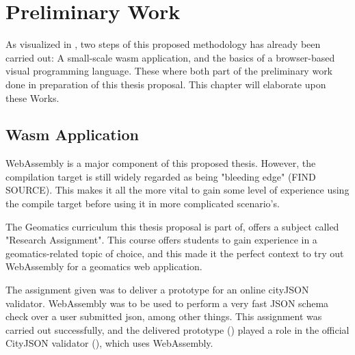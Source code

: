 

\section{Preliminary Work}

As visualized in , two steps of this proposed methodology has already been carried out: A small-scale wasm application, and the basics of a browser-based visual programming language. These where both part of the preliminary work done in preparation of this thesis proposal. This chapter will elaborate upon these Works.


\subsection*{Wasm Application}

WebAssembly is a major component of this proposed thesis. However, the compilation target is still widely regarded as being "bleeding edge" (FIND SOURCE). This makes it all the more vital to gain some level of experience using the compile target before using it in more complicated scenario's. 

The Geomatics curriculum this thesis proposal is part of, offers a subject called "Research Assignment". This course offers students to gain experience in a geomatics-related topic of choice, and this made it the perfect context to try out WebAssembly for a geomatics web application.

The assignment given was to deliver a prototype for an online cityJSON validator. 
WebAssembly was to be used to perform a very fast JSON schema check over a user submitted json, among other things. 
This assignment was carried out successfully, and the delivered prototype () played a role in the official CityJSON validator (), which uses WebAssembly. 

